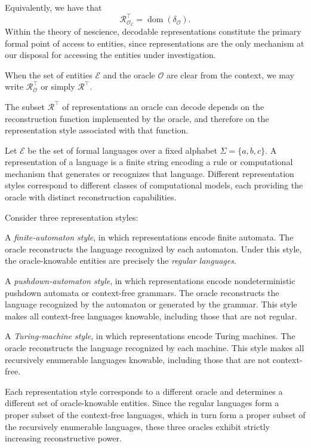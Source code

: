 \noindent
Equivalently, we have that
\[
\mathcal{R}_{\mathcal{O}_{\mathcal{E}}}^{\top}
=
\operatorname{dom}(\delta_{\mathcal O}).
\]
Within the theory of nescience, decodable representations constitute the primary formal point of access to entities, since representations are the only mechanism at our disposal for accessing the entities under investigation.

\begin{notation}
When the set of entities $\mathcal{E}$ and the oracle $\mathcal{O}$ are clear from the context, we may write
$\mathcal{R}_{\mathcal O}^{\top}$ or simply $\mathcal{R}^{\top}$.
\end{notation}

The subset $\mathcal{R}^{\top}$ of representations an oracle can decode depends on the reconstruction function implemented by the oracle, and therefore on the representation style associated with that function.

\begin{example}
\label{ex:formal_languages_oracles}
Let $\mathcal{E}$ be the set of formal languages over a fixed alphabet $\Sigma = \{a,b,c\}$. A representation of a language is a finite string encoding a rule or computational mechanism that generates or recognizes that language. Different representation styles correspond to different classes of computational models, each providing the oracle with distinct reconstruction capabilities.

Consider three representation styles:

A \emph{finite-automaton style}, in which representations encode finite automata. The oracle reconstructs the language recognized by each automaton. Under this style, the oracle-knowable entities are precisely the \emph{regular languages}.

A \emph{pushdown-automaton style}, in which representations encode nondeterministic pushdown automata or context-free grammars. The oracle reconstructs the language recognized by the automaton or generated by the grammar. This style makes all context-free languages knowable, including those that are not regular.

A \emph{Turing-machine style}, in which representations encode Turing machines. The oracle reconstructs the language recognized by each machine. This style makes all recursively enumerable languages knowable, including those that are not context-free.

Each representation style corresponds to a different oracle and determines a different set of oracle-knowable entities. Since the regular languages form a proper subset of the context-free languages, which in turn form a proper subset of the recursively enumerable languages, these three oracles exhibit strictly increasing reconstructive power.
\end{example}

